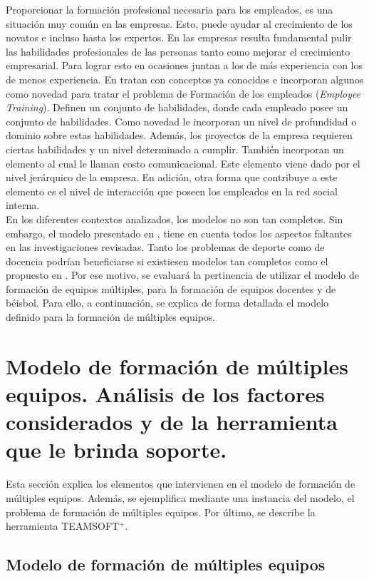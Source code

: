 Proporcionar la formación profesional necesaria para los empleados, es una situación muy común en las empresas. Esto, puede ayudar al crecimiento de los novatos e incluso hasta los expertos. En las empresas resulta fundamental pulir las habilidades profesionales de las personas tanto como mejorar el crecimiento empresarial. Para lograr esto en ocasiones juntan a los de más experiencia con los de menos experiencia. En \cite{Zhang2017} tratan con conceptos ya conocidos e incorporan algunos como novedad para tratar el problema de Formación de los empleados (\textit{Employee Training}). Definen un conjunto de habilidades, donde cada empleado posee un conjunto de habilidades. Como novedad le incorporan un nivel de profundidad o dominio sobre estas habilidades. Además, los proyectos de la empresa requieren ciertas habilidades y un nivel determinado a cumplir. También incorporan un elemento al cual le llaman costo comunicacional. Este elemento viene dado por el nivel jerárquico de la empresa. En adición, otra forma que contribuye a este elemento es el nivel de interacción que poseen los empleados en la red social interna.\\

En los diferentes contextos analizados, los modelos no son tan completos. Sin embargo, el modelo presentado en \cite{Duran2019}, tiene en cuenta todos los aspectos faltantes en las investigaciones revisadas. Tanto los problemas de deporte como de docencia podrían beneficiarse si existiesen modelos tan completos como el propuesto en \cite{Duran2019}. Por ese motivo, se evaluará la pertinencia de utilizar el modelo de formación de equipos múltiples, para la formación de equipos docentes y de béisbol. Para ello, a continuación, se explica de forma detallada el modelo definido para la formación de múltiples equipos.

\section{Modelo de formación de múltiples equipos. Análisis de los factores considerados y de la herramienta que le brinda soporte.}

Esta sección explica los elementos que intervienen en el modelo de formación de múltiples equipos. Además, se ejemplifica mediante una instancia del modelo, el problema de formación de múltiples equipos. Por último, se describe la herramienta TEAMSOFT$^+$.

\subsection{Modelo de formación de múltiples equipos} \label{sec:modelo-teamsoft}

